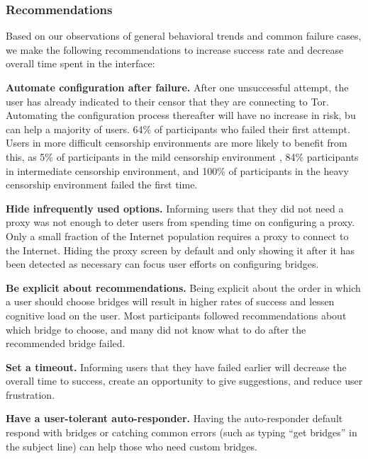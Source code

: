 \documentclass[USenglish,oneside,twocolumn]{article}
\begin{document}
\subsubsection{Recommendations}
Based on our observations of general behavioral trends and common failure cases, we make the following recommendations to increase success rate and decrease overall time spent in the interface: \\

\begin{description}
\item {\bfseries Automate configuration after failure.} After one unsuccessful attempt, the user has already indicated to their censor that they are connecting to Tor. Automating the configuration process thereafter will have no increase in risk, bu can help a majority of users. 64\% of participants who failed their first attempt. Users in more difficult censorship environments are more likely to benefit from this, as 5\% of participants in the mild censorship environment , 84\% participants in intermediate censorship environment, and 100\% of participants in the heavy censorship environment failed the first time.
\item{\bfseries Hide infrequently used options.} Informing users that they did not need a proxy was not enough to deter users from spending time on configuring a proxy. Only a small fraction of the Internet population requires a proxy to connect to the Internet. Hiding the proxy screen by default and only showing it after it has been detected as necessary can focus user efforts on configuring bridges.
\item {\bfseries Be explicit about recommendations.} Being explicit about the order in which a user should choose bridges will result in higher rates of success and lessen cognitive load on the user. Most participants followed recommendations about which bridge to choose, and many did not know what to do after the recommended bridge failed. 
\item{\bfseries Set a timeout.} Informing users that they have failed earlier will decrease the overall time to success, create an opportunity to give suggestions, and reduce user frustration. 
\item{\bfseries Have a user-tolerant auto-responder.} Having the auto-responder default respond with bridges or catching common errors (such as typing ``get bridges'' in the subject line) can help those who need custom bridges. 
\end{description} 
\end{document}
